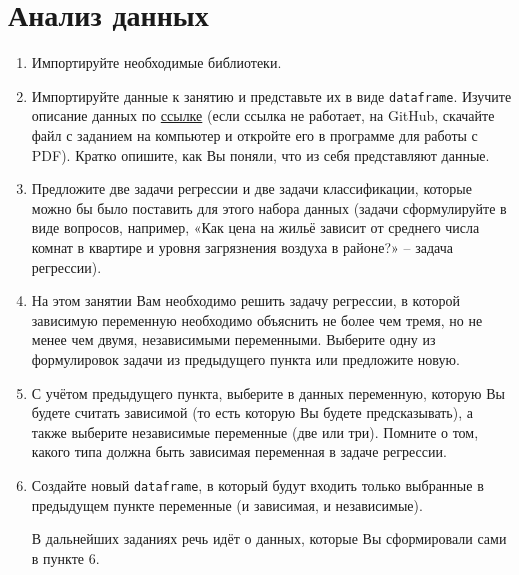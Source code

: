 \documentclass[11pt, a4paper]{extarticle}
\begin{document}
\section{Анализ данных}
\begin{enumerate}
	\item Импортируйте необходимые библиотеки.
	\item Импортируйте данные к занятию и представьте их в виде {\tt dataframe}. Изучите описание данных по \href{https://www.kaggle.com/budincsevity/szeged-weather}{ссылке} (если ссылка не работает, на GitHub, скачайте файл с заданием на компьютер и откройте его в программе для работы с PDF). Кратко опишите, как Вы поняли, что из себя представляют данные. 
	\item Предложите две задачи регрессии и две задачи классификации, которые можно бы было поставить для этого набора данных (задачи сформулируйте в виде вопросов, например, «Как цена на жильё зависит от среднего числа комнат в квартире и уровня загрязнения воздуха в районе?» – задача регрессии). 
	\item На этом занятии Вам необходимо решить задачу регрессии, в которой зависимую переменную необходимо объяснить не более чем тремя, но не менее чем двумя, независимыми переменными. Выберите одну из формулировок задачи из предыдущего пункта или предложите новую. 
	\item С учётом предыдущего пункта, выберите в данных переменную, которую Вы будете считать зависимой (то есть которую Вы будете предсказывать), а также выберите независимые переменные (две или три). Помните о том, какого типа должна быть зависимая переменная в задаче регрессии. 
	\item Создайте новый {\tt dataframe}, в который будут входить только выбранные в предыдущем пункте переменные (и зависимая, и независимые). 
	
	\vspace{1.5em}
	В дальнейших заданиях речь идёт о данных, которые Вы сформировали сами в пункте 6.
	

\end{enumerate}
\end{document}
